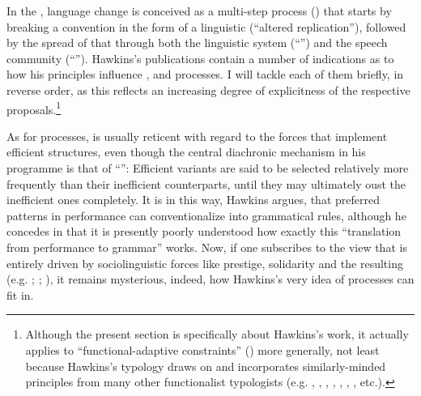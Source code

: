 \documentclass[output=paper]{langsci/langscibook}
\begin{document}
In the , language change is conceived as a multi-step process (\citealt{Croft2000_Change,Croft2006_Change,Aitchison2013_Change}) that starts by breaking a convention in the form of a linguistic  (“altered replication”), followed by the spread of that  through both the linguistic system (“”) and the speech community (“”). Hawkins’s publications contain a number of indications as to how his  principles influence ,  and  processes. I will tackle each of them briefly, in reverse order, as this reflects an increasing degree of explicitness of the respective proposals.\footnote{Although the present section is specifically about Hawkins’s work, it actually applies to “functional-adaptive constraints” () more generally, not least because Hawkins’s  typology draws on and incorporates similarly-minded principles from many other functionalist typologists (e.g. , , , , , , , etc.).}

As for  processes,  is usually reticent with regard to the forces that implement efficient structures, even though the central diachronic mechanism in his programme is that of “”: Efficient variants are said to be selected relatively more frequently than their inefficient counterparts, until they may ultimately oust the inefficient ones completely. It is in this way, Hawkins argues, that preferred patterns in performance can conventionalize into grammatical rules, although he concedes in \citet[10]{Hawkins2014_VarEff} that it is presently poorly understood how exactly this “translation from performance to grammar” works. Now, if one subscribes to the view that  is entirely driven by sociolinguistic forces like prestige, solidarity and the resulting  (e.g. \citealt{Croft2000_Change}; \citealt{Cristofaro2017_Dep}; ), it remains mysterious, indeed, how Hawkins’s very idea of  processes can fit in. 
\end{document}
